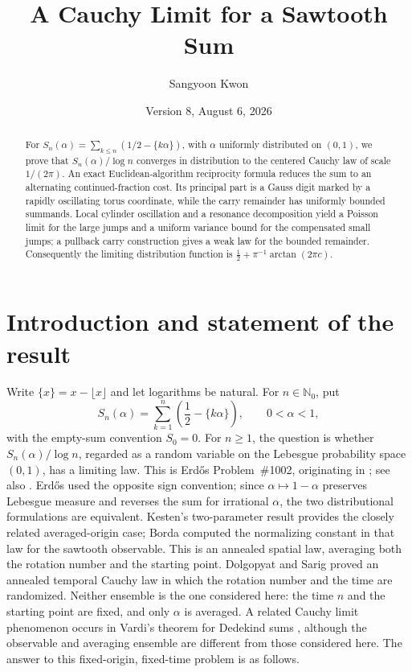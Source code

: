 \documentclass[11pt,a4paper]{amsart}
\title{A Cauchy Limit for a Sawtooth Sum}
\author{Sangyoon Kwon}
\date{Version 8, August 6, 2026}
\theoremstyle{definition}
\theoremstyle{remark}
\newcommand{\N}{\mathbb N}
\begin{document}
\begin{abstract}
For $S_n(\alpha)=\sum_{k\le n}(1/2-\{k\alpha\})$, with $\alpha$ uniformly distributed on $(0,1)$, we prove that $S_n(\alpha)/\log n$ converges in distribution to the centered Cauchy law of scale $1/(2\pi)$.  An exact Euclidean-algorithm reciprocity formula reduces the sum to an alternating continued-fraction cost.  Its principal part is a Gauss digit marked by a rapidly oscillating torus coordinate, while the carry remainder has uniformly bounded summands.  Local cylinder oscillation and a resonance decomposition yield a Poisson limit for the large jumps and a uniform variance bound for the compensated small jumps; a pullback carry construction gives a weak law for the bounded remainder.  Consequently the limiting distribution function is $\frac12+\pi^{-1}\arctan(2\pi c)$.
\end{abstract}

\maketitle

\section{Introduction and statement of the result}

Write $\{x\}=x-\lfloor x\rfloor$ and let logarithms be natural.  For
$n\in\N_0$, put
\[
 S_n(\alpha)=\sum_{k=1}^{n}\left(\frac12-\{k\alpha\}\right),
 \qquad 0<\alpha<1,
\]
with the empty-sum convention $S_0=0$.  For $n\ge1$, the question is whether
$S_n(\alpha)/\log n$, regarded as a random variable on
the Lebesgue probability space $(0,1)$, has a limiting law.  This is
Erd\H{o}s Problem~\#1002, originating in \cite{Er64b}; see also
\cite{Bloom1002}.  Erd\H{o}s used the opposite sign convention; since
$\alpha\mapsto1-\alpha$ preserves Lebesgue measure and reverses the
sum for irrational $\alpha$, the two distributional formulations are
equivalent.  Kesten's two-parameter result \cite{Ke60} provides the
closely related averaged-origin case; Borda \cite{Borda25} computed the
normalizing constant in that law for the sawtooth observable.  This is an
annealed spatial law, averaging both the rotation number and the starting
point.  Dolgopyat and Sarig \cite{DS20} proved an annealed temporal Cauchy
law in which the rotation number and the time are randomized.  Neither
ensemble is the one considered here: the time $n$ and the starting point are
fixed, and only $\alpha$ is averaged.  A related Cauchy limit phenomenon
occurs in Vardi's theorem for Dedekind sums \cite{Vardi93}, although the
observable and averaging ensemble are different from those considered here.
The answer to this
fixed-origin, fixed-time problem is as follows.
\end{document}
